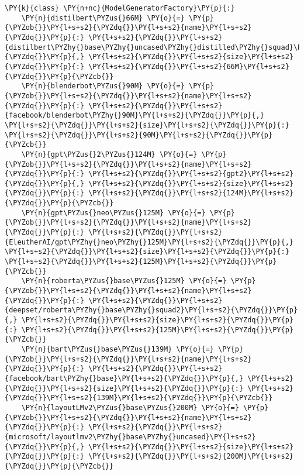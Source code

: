 \documentclass[11pt]{wseas}
\begin{document}
\begin{tcolorbox}[breakable, size=fbox, boxrule=1pt, pad at break*=1mm,colback=cellbackground, colframe=cellborder]
\begin{Verbatim}[commandchars=\\\{\}]
\PY{k}{class} \PY{n+nc}{ModelGeneratorFactory}\PY{p}{:}
    \PY{n}{distilbert\PYZus{}66M} \PY{o}{=} \PY{p}{\PYZob{}}\PY{l+s+s2}{\PYZdq{}}\PY{l+s+s2}{name}\PY{l+s+s2}{\PYZdq{}}\PY{p}{:} \PY{l+s+s2}{\PYZdq{}}\PY{l+s+s2}{distilbert\PYZhy{}base\PYZhy{}uncased\PYZhy{}distilled\PYZhy{}squad}\PY{l+s+s2}{\PYZdq{}}\PY{p}{,} \PY{l+s+s2}{\PYZdq{}}\PY{l+s+s2}{size}\PY{l+s+s2}{\PYZdq{}}\PY{p}{:} \PY{l+s+s2}{\PYZdq{}}\PY{l+s+s2}{66M}\PY{l+s+s2}{\PYZdq{}}\PY{p}{\PYZcb{}}
    \PY{n}{blenderbot\PYZus{}90M} \PY{o}{=} \PY{p}{\PYZob{}}\PY{l+s+s2}{\PYZdq{}}\PY{l+s+s2}{name}\PY{l+s+s2}{\PYZdq{}}\PY{p}{:} \PY{l+s+s2}{\PYZdq{}}\PY{l+s+s2}{facebook/blenderbot\PYZhy{}90M}\PY{l+s+s2}{\PYZdq{}}\PY{p}{,} \PY{l+s+s2}{\PYZdq{}}\PY{l+s+s2}{size}\PY{l+s+s2}{\PYZdq{}}\PY{p}{:} \PY{l+s+s2}{\PYZdq{}}\PY{l+s+s2}{90M}\PY{l+s+s2}{\PYZdq{}}\PY{p}{\PYZcb{}}
    \PY{n}{gpt\PYZus{}2\PYZus{}124M} \PY{o}{=} \PY{p}{\PYZob{}}\PY{l+s+s2}{\PYZdq{}}\PY{l+s+s2}{name}\PY{l+s+s2}{\PYZdq{}}\PY{p}{:} \PY{l+s+s2}{\PYZdq{}}\PY{l+s+s2}{gpt2}\PY{l+s+s2}{\PYZdq{}}\PY{p}{,} \PY{l+s+s2}{\PYZdq{}}\PY{l+s+s2}{size}\PY{l+s+s2}{\PYZdq{}}\PY{p}{:} \PY{l+s+s2}{\PYZdq{}}\PY{l+s+s2}{124M}\PY{l+s+s2}{\PYZdq{}}\PY{p}{\PYZcb{}}
    \PY{n}{gpt\PYZus{}neo\PYZus{}125M} \PY{o}{=} \PY{p}{\PYZob{}}\PY{l+s+s2}{\PYZdq{}}\PY{l+s+s2}{name}\PY{l+s+s2}{\PYZdq{}}\PY{p}{:} \PY{l+s+s2}{\PYZdq{}}\PY{l+s+s2}{EleutherAI/gpt\PYZhy{}neo\PYZhy{}125M}\PY{l+s+s2}{\PYZdq{}}\PY{p}{,} \PY{l+s+s2}{\PYZdq{}}\PY{l+s+s2}{size}\PY{l+s+s2}{\PYZdq{}}\PY{p}{:} \PY{l+s+s2}{\PYZdq{}}\PY{l+s+s2}{125M}\PY{l+s+s2}{\PYZdq{}}\PY{p}{\PYZcb{}}
    \PY{n}{roberta\PYZus{}base\PYZus{}125M} \PY{o}{=} \PY{p}{\PYZob{}}\PY{l+s+s2}{\PYZdq{}}\PY{l+s+s2}{name}\PY{l+s+s2}{\PYZdq{}}\PY{p}{:} \PY{l+s+s2}{\PYZdq{}}\PY{l+s+s2}{deepset/roberta\PYZhy{}base\PYZhy{}squad2}\PY{l+s+s2}{\PYZdq{}}\PY{p}{,} \PY{l+s+s2}{\PYZdq{}}\PY{l+s+s2}{size}\PY{l+s+s2}{\PYZdq{}}\PY{p}{:} \PY{l+s+s2}{\PYZdq{}}\PY{l+s+s2}{125M}\PY{l+s+s2}{\PYZdq{}}\PY{p}{\PYZcb{}}
    \PY{n}{bart\PYZus{}base\PYZus{}139M} \PY{o}{=} \PY{p}{\PYZob{}}\PY{l+s+s2}{\PYZdq{}}\PY{l+s+s2}{name}\PY{l+s+s2}{\PYZdq{}}\PY{p}{:} \PY{l+s+s2}{\PYZdq{}}\PY{l+s+s2}{facebook/bart\PYZhy{}base}\PY{l+s+s2}{\PYZdq{}}\PY{p}{,} \PY{l+s+s2}{\PYZdq{}}\PY{l+s+s2}{size}\PY{l+s+s2}{\PYZdq{}}\PY{p}{:} \PY{l+s+s2}{\PYZdq{}}\PY{l+s+s2}{139M}\PY{l+s+s2}{\PYZdq{}}\PY{p}{\PYZcb{}}
    \PY{n}{layoutLMv2\PYZus{}base\PYZus{}200M} \PY{o}{=} \PY{p}{\PYZob{}}\PY{l+s+s2}{\PYZdq{}}\PY{l+s+s2}{name}\PY{l+s+s2}{\PYZdq{}}\PY{p}{:} \PY{l+s+s2}{\PYZdq{}}\PY{l+s+s2}{microsoft/layoutlmv2\PYZhy{}base\PYZhy{}uncased}\PY{l+s+s2}{\PYZdq{}}\PY{p}{,} \PY{l+s+s2}{\PYZdq{}}\PY{l+s+s2}{size}\PY{l+s+s2}{\PYZdq{}}\PY{p}{:} \PY{l+s+s2}{\PYZdq{}}\PY{l+s+s2}{200M}\PY{l+s+s2}{\PYZdq{}}\PY{p}{\PYZcb{}}

\end{Verbatim}
\end{tcolorbox}
\end{document}
